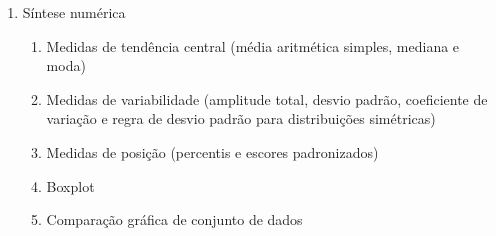 \begin{enumerate}
\begin{enumerate}
			\item Síntese numérica
			\begin{enumerate}
				\item Medidas de tendência central (média aritmética simples, mediana e moda)
				\item Medidas de variabilidade (amplitude total, desvio padrão, coeficiente de variação e regra de desvio padrão para distribuições simétricas)
				\item Medidas de posição (percentis e escores padronizados)
				\item Boxplot
				\item Comparação gráfica de conjunto de dados
			\end{enumerate}
		\end{enumerate}
\end{enumerate}

